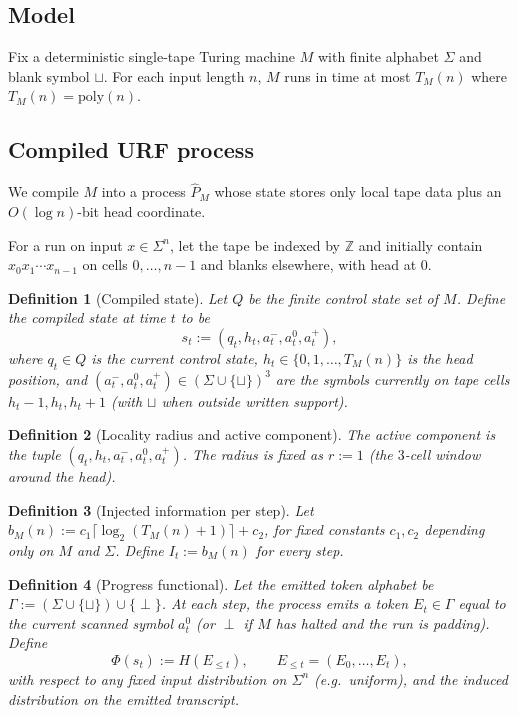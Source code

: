 \documentclass[11pt]{article}
\newtheorem{definition}{Definition}
\begin{document}
\subsection{Model}
Fix a deterministic single-tape Turing machine $M$ with finite alphabet $\Sigma$ and blank symbol $\sqcup$.
For each input length $n$, $M$ runs in time at most $T_M(n)$ where $T_M(n)=\mathrm{poly}(n)$.

\subsection{Compiled URF process}
We compile $M$ into a process $\widehat P_M$ whose state stores only local tape data plus an
$O(\log n)$-bit head coordinate.

For a run on input $x\in\Sigma^n$, let the tape be indexed by $\mathbb{Z}$ and initially contain
$x_0x_1\cdots x_{n-1}$ on cells $0,\dots,n-1$ and blanks elsewhere, with head at $0$.

\begin{definition}[Compiled state]
Let $Q$ be the finite control state set of $M$.
Define the compiled state at time $t$ to be
\[
s_t := (q_t, h_t, a^-_t, a^0_t, a^+_t),
\]
where $q_t\in Q$ is the current control state, $h_t\in\{0,1,\dots,T_M(n)\}$ is the head position,
and $(a^-_t,a^0_t,a^+_t)\in(\Sigma\cup\{\sqcup\})^3$ are the symbols currently on tape cells
$h_t-1,h_t,h_t+1$ (with $\sqcup$ when outside written support).
\end{definition}

\begin{definition}[Locality radius and active component]
The active component is the tuple $(q_t,h_t,a^-_t,a^0_t,a^+_t)$.
The radius is fixed as $r:=1$ (the $3$-cell window around the head).
\end{definition}

\begin{definition}[Injected information per step]
Let $b_M(n):=c_1\lceil\log_2(T_M(n)+1)\rceil + c_2$, for fixed constants $c_1,c_2$ depending only on
$M$ and $\Sigma$. Define $I_t:=b_M(n)$ for every step.
\end{definition}

\begin{definition}[Progress functional]
Let the emitted token alphabet be $\Gamma := (\Sigma\cup\{\sqcup\})\cup\{\perp\}$.
At each step, the process emits a token $E_t\in\Gamma$ equal to the current scanned symbol $a^0_t$
(or $\perp$ if $M$ has halted and the run is padding).
Define
\[
\Phi(s_t) := H(E_{\le t}),
\qquad E_{\le t}=(E_0,\dots,E_t),
\]
with respect to any fixed input distribution on $\Sigma^n$ (e.g.\ uniform), and the induced
distribution on the emitted transcript.
\end{definition}
\end{document}
